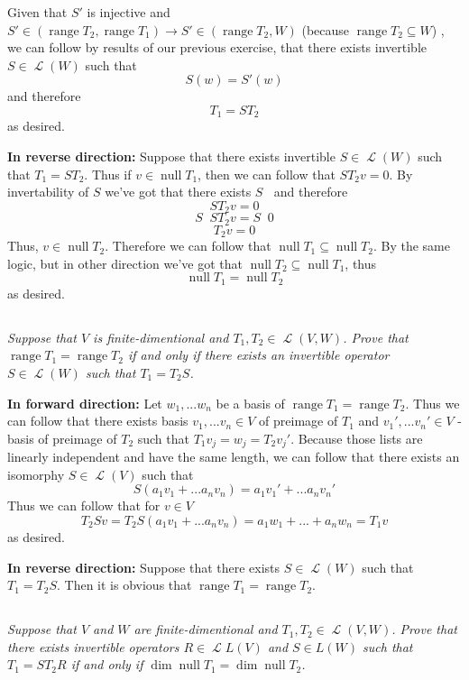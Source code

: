 \documentclass[11pt,oneside,titlepage]{book}
\DeclareMathOperator \map {\mathcal {L}}
\DeclareMathOperator \ns {null}
\DeclareMathOperator \range {range}
\DeclareMathOperator \inv {^{-1}}
\begin{document}
Given that $S'$ is injective and $S' \in (\range T_2, \range T_1) \to S' \in (\range T_2, W)$
(because $\range T_2 \subseteq W$) , we can follow by results of our previous exercise, that there
exists invertible  $S \in \map (W)$ such that
$$S(w) = S'(w)$$
and therefore
$$T_1 = S T_2$$
as desired.

\textbf{In reverse direction: }
Suppose that there exists invertible $S \in \map(W)$ such that $T_1 = S T_2$.
Thus if $v \in \ns T_1$, then we can follow that $S T_2 v = 0$. By invertability of $S$ we've got
that there exists $S \inv$ and therefore
$$S T_2 v = 0$$
$$S \inv S T_2 v = S \inv 0$$
$$T_2 v = 0$$
Thus, $v \in \ns T_2$. Therefore we can follow that $\ns T_1 \subseteq \ns T_2$. By the same
logic, but in other direction we've got that $\ns T_2 \subseteq \ns T_1$, thus
$$\ns T_1 = \ns T_2$$
as desired.


\subsection{}

\textit{Suppose that $V$ is finite-dimentional and $T_1, T_2 \in \map(V, W)$. Prove that
  $\range T_1 = \range T_2$ if and only if there exists an invertible operator $S \in \map (W)$
  such that $T_1 = T_2 S$.}

\textbf{In forward direction: }
Let $w_1, ... w_n$ be a basis of $\range T_1 = \range T_2$. Thus we can follow that there exists
basis $v_1, ... v_n \in V$ of preimage of $T_1$  and $v_1', ... v_n' \in V$  - basis of preimage
of $T_2$ such that $T_1 v_j = w_j = T_2 v_j'$.
Because those lists are linearly independent and have the same length, we
can follow that there exists an isomorphy $S \in \map (V)$ such that
$$S(a_1 v_1 + ... a_n v_n) = a_1 v_1' + ... a_n v_n'$$
Thus we can follow that for $v \in V$
$$T_2 S v = T_2 S (a_1 v_1 + ... a_n v_n) = a_1 w_1 + ... + a_n w_n = T_1 v$$
as desired.

\textbf{In reverse direction: }
Suppose that there exists $S \in \map (W)$ such that $T_1 = T_2 S$. Then it is obvious that
$\range T_1 = \range T_2$.

\subsection{}

\textit{Suppose that $V$ and $W$ are finite-dimentional and $T_1, T_2 \in \map (V, W)$. Prove that
  there exists invertible operators $R \in \map L(V)$ and $S \in L(W)$ such that
  $T_1 = S T_2 R$ if and only if $\dim \ns T_1 = \dim \ns T_2$.}
\end{document}

